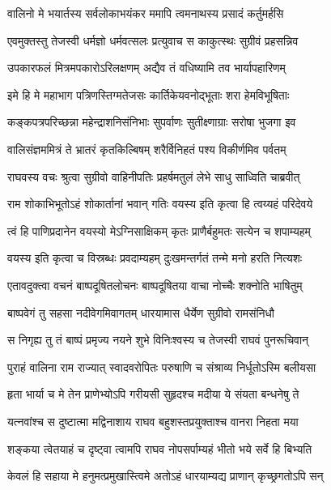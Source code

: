\twolineshloka
{वालिनो मे भयार्तस्य सर्वलोकाभयंकर}
{ममापि त्वमनाथस्य प्रसादं कर्तुमर्हसि} %

\twolineshloka
{एवमुक्तस्तु तेजस्वी धर्मज्ञो धर्मवत्सलः}
{प्रत्युवाच स काकुत्स्थः सुग्रीवं प्रहसन्निव} %

\twolineshloka
{उपकारफलं मित्रमपकारोऽरिलक्षणम्}
{अद्यैव तं वधिष्यामि तव भार्यापहारिणम्} %

\twolineshloka
{इमे हि मे महाभाग पत्रिणस्तिग्मतेजसः}
{कार्तिकेयवनोद्भूताः शरा हेमविभूषिताः} %

\twolineshloka
{कङ्कपत्रपरिच्छन्ना महेन्द्राशनिसंनिभाः}
{सुपर्वाणः सुतीक्ष्णाग्राः सरोषा भुजगा इव} %

\twolineshloka
{वालिसंज्ञममित्रं ते भ्रातरं कृतकिल्बिषम्}
{शरैर्विनिहतं पश्य विकीर्णमिव पर्वतम्} %

\twolineshloka
{राघवस्य वचः श्रुत्वा सुग्रीवो वाहिनीपतिः}
{प्रहर्षमतुलं लेभे साधु साध्विति चाब्रवीत्} %

\twolineshloka
{राम शोकाभिभूतोऽहं शोकार्तानां भवान् गतिः}
{वयस्य इति कृत्वा हि त्वय्यहं परिदेवये} %

\twolineshloka
{त्वं हि पाणिप्रदानेन वयस्यो मेऽग्निसाक्षिकम्}
{कृतः प्राणैर्बहुमतः सत्येन च शपाम्यहम्} %

\twolineshloka
{वयस्य इति कृत्वा च विस्रब्धः प्रवदाम्यहम्}
{दुःखमन्तर्गतं तन्मे मनो हरति नित्यशः} %

\twolineshloka
{एतावदुक्त्वा वचनं बाष्पदूषितलोचनः}
{बाष्पदूषितया वाचा नोच्चैः शक्नोति भाषितुम्} %

\twolineshloka
{बाष्पवेगं तु सहसा नदीवेगमिवागतम्}
{धारयामास धैर्येण सुग्रीवो रामसंनिधौ} %

\twolineshloka
{स निगृह्य तु तं बाष्पं प्रमृज्य नयने शुभे}
{विनिःश्वस्य च तेजस्वी राघवं पुनरूचिवान्} %

\twolineshloka
{पुराहं वालिना राम राज्यात् स्वादवरोपितः}
{परुषाणि च संश्राव्य निर्धूतोऽस्मि बलीयसा} %

\twolineshloka
{हृता भार्या च मे तेन प्राणेभ्योऽपि गरीयसी}
{सुहृदश्च मदीया ये संयता बन्धनेषु ते} %

\twolineshloka
{यत्नवांश्च स दुष्टात्मा मद्विनाशाय राघव}
{बहुशस्तप्रयुक्ताश्च वानरा निहता मया} %

\twolineshloka
{शङ्कया त्वेतयाहं च दृष्ट्वा त्वामपि राघव}
{नोपसर्पाम्यहं भीतो भये सर्वे हि बिभ्यति} %

\twolineshloka
{केवलं हि सहाया मे हनुमत्प्रमुखास्त्विमे}
{अतोऽहं धारयाम्यद्य प्राणान् कृच्छ्रगतोऽपि सन्} %

